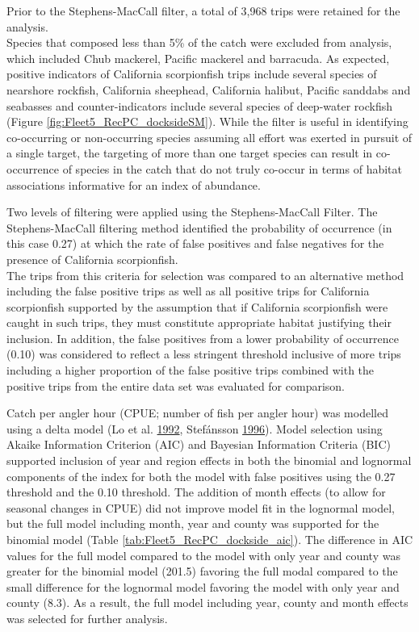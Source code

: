\documentclass[12pt,]{article}
\begin{document}
Prior to the Stephens-MacCall filter, a total of 3,968 trips were
retained for the analysis.\\
Species that composed less than 5\% of the catch were excluded from
analysis, which included Chub mackerel, Pacific mackerel and barracuda.
As expected, positive indicators of California scorpionfish trips
include several species of nearshore rockfish, California sheephead,
California halibut, Pacific sanddabs and seabasses and
counter-indicators include several species of deep-water rockfish
(Figure \ref{fig:Fleet5_RecPC_docksideSM}). While the filter is useful
in identifying co-occurring or non-occurring species assuming all effort
was exerted in pursuit of a single target, the targeting of more than
one target species can result in co-occurrence of species in the catch
that do not truly co-occur in terms of habitat associations informative
for an index of abundance.

Two levels of filtering were applied using the Stephens-MacCall Filter.
The Stephens-MacCall filtering method identified the probability of
occurrence (in this case 0.27) at which the rate of false positives and
false negatives for the presence of California scorpionfish.\\
The trips from this criteria for selection was compared to an
alternative method including the false positive trips as well as all
positive trips for California scorpionfish supported by the assumption
that if California scorpionfish were caught in such trips, they must
constitute appropriate habitat justifying their inclusion. In addition,
the false positives from a lower probability of occurrence (0.10) was
considered to reflect a less stringent threshold inclusive of more trips
including a higher proportion of the false positive trips combined with
the positive trips from the entire data set was evaluated for
comparison.

Catch per angler hour (CPUE; number of fish per angler hour) was
modelled using a delta model (Lo et al.
\protect\hyperlink{ref-Lo1992}{1992}, Stefánsson
\protect\hyperlink{ref-Stefansson1996}{1996}). Model selection using
Akaike Information Criterion (AIC) and Bayesian Information Criteria
(BIC) supported inclusion of year and region effects in both the
binomial and lognormal components of the index for both the model with
false positives using the 0.27 threshold and the 0.10 threshold. The
addition of month effects (to allow for seasonal changes in CPUE) did
not improve model fit in the lognormal model, but the full model
including month, year and county was supported for the binomial model
(Table \ref{tab:Fleet5_RecPC_dockside_aic}). The difference in AIC
values for the full model compared to the model with only year and
county was greater for the binomial model (201.5) favoring the full
modal compared to the small difference for the lognormal model favoring
the model with only year and county (8.3). As a result, the full model
including year, county and month effects was selected for further
analysis.
\end{document}
